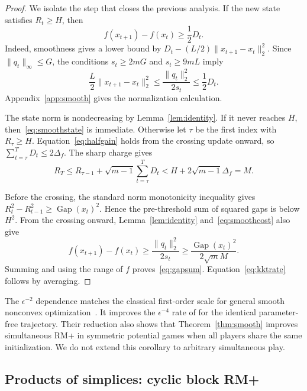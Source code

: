 \documentclass{article}
\newcommand{\Gap}{\operatorname{Gap}}
\begin{document}
\begin{proof}
We isolate the step that closes the previous analysis. If the new state satisfies $R_t\ge H$, then
\begin{equation}
f(x_{t+1})-f(x_t)\ge\frac12D_t.
\label{eq:halfgain}
\end{equation}
Indeed, smoothness gives a lower bound by $D_t-(L/2)\|x_{t+1}-x_t\|_2^2$. Since $\|q_t\|_\infty\le G$, the conditions $s_t\ge2mG$ and $s_t\ge9mL$ imply
\begin{equation}
\frac L2\|x_{t+1}-x_t\|_2^2
\le\frac{\|q_t\|_2^2}{2s_t}
\le\frac12D_t.
\label{eq:smoothcost}
\end{equation}
Appendix~\ref{app:smooth} gives the normalization calculation.

The state norm is nondecreasing by Lemma~\ref{lem:identity}. If it never reaches $H$, then~\eqref{eq:smoothstate} is immediate. Otherwise let $\tau$ be the first index with $R_\tau\ge H$. Equation~\eqref{eq:halfgain} holds from the crossing update onward, so $\sum_{t=\tau}^TD_t\le2\Delta_f$. The sharp charge gives
\begin{equation}
R_T\le R_{\tau-1}+\sqrt{m-1}\sum_{t=\tau}^TD_t
<H+2\sqrt{m-1}\Delta_f=M.
\end{equation}

Before the crossing, the standard norm monotonicity inequality gives $R_t^2-R_{t-1}^2\ge\Gap(x_t)^2$. Hence the pre-threshold sum of squared gaps is below $H^2$. From the crossing onward, Lemma~\ref{lem:identity} and~\eqref{eq:smoothcost} also give
\begin{equation}
f(x_{t+1})-f(x_t)
\ge\frac{\|q_t\|_2^2}{2s_t}
\ge\frac{\Gap(x_t)^2}{2\sqrt m M}.
\end{equation}
Summing and using the range of $f$ proves~\eqref{eq:gapsum}. Equation~\eqref{eq:kktrate} follows by averaging.
\end{proof}

The $\epsilon^{-2}$ dependence matches the classical first-order scale for general smooth nonconvex optimization~\citep{Carmon19:Lower}. It improves the $\epsilon^{-4}$ rate of \citet{Anagnostides26:Convergence} for the identical parameter-free trajectory. Their reduction also shows that Theorem~\ref{thm:smooth} improves simultaneous RM+ in symmetric potential games when all players share the same initialization. We do not extend this corollary to arbitrary simultaneous play.

\subsection{Products of simplices: cyclic block RM+}
\label{sec:product}
\end{document}
